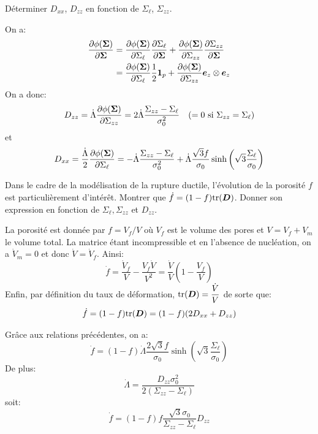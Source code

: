 \documentclass[french,12pt]{exam}
\begin{document}
\begin{questions}
\question Déterminer $D_{xx}$, $D_{zz}$ en fonction de $\Sigma_\ell$, $\Sigma_{zz}$.
 \begin{solution}
 On a:
\begin{align*}
\frac{\partial \phi(\boldsymbol{\Sigma})}{\partial \boldsymbol{\Sigma}} &= \frac{\partial \phi(\boldsymbol{\Sigma})}{\partial \Sigma_\ell}\frac{\partial \Sigma_\ell}{\partial \boldsymbol{\Sigma}} + \frac{\partial \phi(\boldsymbol{\Sigma})}{\partial \Sigma_{zz}}\frac{\partial \Sigma_{zz}}{\partial \boldsymbol{\Sigma}}\\
 &= \frac{\partial \phi(\boldsymbol{\Sigma})}{\partial \Sigma_\ell}\dfrac{1}{2}\boldsymbol{1}_p + \frac{\partial \phi(\boldsymbol{\Sigma})}{\partial \Sigma_{zz}}\boldsymbol{e}_z\otimes\boldsymbol{e}_z
\end{align*}
On a donc:
 $$D_{zz} = \dot{\Lambda}\dfrac{\partial \phi(\boldsymbol{\Sigma})}{\partial \Sigma_{zz}} = 2\dot{\Lambda}\dfrac{\Sigma_{zz}-\Sigma_\ell}{\sigma_0^2} \quad (=0\text{ si } \Sigma_{zz}=\Sigma_\ell)$$
et
$$D_{xx} = \dfrac{\dot{\Lambda}}{2}\dfrac{\partial \phi(\boldsymbol{\Sigma})}{\partial \Sigma_\ell} = -\dot{\Lambda}\dfrac{\Sigma_{zz}-\Sigma_\ell}{\sigma_0^2} +  \dot{\Lambda}\dfrac{\sqrt{3}f}{\sigma_0} \sinh{\left(  \sqrt{3} \frac{\Sigma_\ell}{\sigma_0} \right)} $$
 \end{solution} 


 \question Dans le cadre de la modélisation de la rupture ductile, l'évolution de la porosité $f$ est particulièrement d'intérêt. Montrer que $\dot{f} = (1 - f) \mathrm{tr} (\boldsymbol{D})$. Donner son expression en fonction de $\Sigma_\ell,\Sigma_{zz}$ et $D_{zz}$.
\begin{solution}
La porosité est donnée par $f=V_f/V$ où $V_f$ est le volume des pores et $V=V_f+V_m$ le volume total. La matrice étant incompressible et en l'absence de nucléation, on a $\dot{V}_m=0$ et donc $\dot{V}=\dot{V}_f$. Ainsi:
$$\dot{f} = \dfrac{\dot{V}_f}{V}-\dfrac{V_f\dot{V}}{V^2} = \dfrac{\dot{V}}{V}\left(1-\dfrac{V_f}{V}\right)$$
Enfin, par définition du taux de déformation, $\mathrm{tr}( \boldsymbol{D}) =  \dfrac{\dot{V}}{V}$ de sorte que:
$$\dot{f}=(1-f)\mathrm{tr}(\boldsymbol{D}) = (1-f)(2D_{xx}+D_{zz})$$

Grâce aux relations précédentes, on a:
$$\dot{f} = (1-f)\dot{\Lambda}\dfrac{2\sqrt{3}f}{\sigma_0} \sinh{\left(  \sqrt{3} \frac{\Sigma_\ell}{\sigma_0} \right)} $$
De plus:
$$\dot{\Lambda}= \dfrac{D_{zz}\sigma_0^2}{2(\Sigma_{zz}-\Sigma_\ell)}$$
soit:
$$\dot{f} = (1-f)f\dfrac{\sqrt{3}\sigma_0}{\Sigma_{zz}-\Sigma_\ell}D_{zz}$$
\end{solution}
\end{questions}
\end{document}
